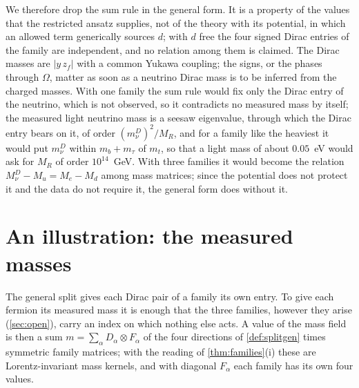 We therefore drop the sum rule in the general form. It is a property of the values that the restricted ansatz supplies, not of the theory
with its potential, in which an allowed term generically sources $d$; with $d$ free the four signed Dirac entries of the family are independent, and no relation among
them is claimed. The Dirac masses are $|y\,z_f|$ with a common Yukawa coupling; the signs, or the phases through $\Omega$, matter as soon as a
neutrino Dirac mass is to be inferred from the charged masses. With one family the sum rule would fix only the Dirac entry of the neutrino,
which is not observed, so it contradicts no measured mass by itself; the measured light neutrino mass is a seesaw eigenvalue, through which
the Dirac entry bears on it, of order
$(m_\nu^D)^2/M_R$, and for a family like the heaviest it would put $m_\nu^D$ within $m_b+m_\tau$ of $m_t$, so that a light mass of about
$0.05$~eV would ask for $M_R$ of order $10^{14}$~GeV. With three families it would become the relation $M_\nu^D-M_u=M_e-M_d$ among mass
matrices; since the potential does not protect it and the data do not require it, the general form does without it.

\section{An illustration: the measured masses}
\label{sec:observed}

The general split gives each Dirac pair of a family its own entry. To give each fermion its measured mass it is enough that the three
families, however they arise (\cref{sec:open}), carry an index on which nothing else acts. A value of the mass field is then a sum
$m=\sum_\alpha D_\alpha\otimes F_\alpha$ of the four directions of \cref{def:splitgen} times symmetric family matrices; with the reading of
\cref{thm:families}(i) these are Lorentz-invariant mass kernels, and with diagonal $F_\alpha$ each family has its own four values.

